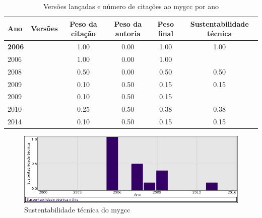 \begin{table}[H]
\caption{Versões lançadas e número de citações ao mygcc por ano}
\centering
\begin{tabular}{| l | c | c | c | c | c |}
  \hline
  Ano & Versões & Peso da citação & Peso da autoria & Peso final & Sustentabilidade técnica \\
  \hline
            {\bf 2006}
          &
          
          &
          1.00
          &
          0.00
          &
          1.00
          &
            {\color{blue} 1.00}
          \\
            2006
          &
          
          &
          1.00
          &
          0.00
          &
          1.00
          &
          \\
\hline
            2008
          &
          
          &
          0.50
          &
          0.00
          &
          0.50
          &
            {\color{blue} 0.50}
          \\
\hline
            2009
          &
          
          &
          0.10
          &
          0.50
          &
          0.15
          &
            {\color{red} 0.15}
          \\
            2009
          &
          
          &
          0.10
          &
          0.50
          &
          0.15
          &
          \\
\hline
            2010
          &
          
          &
          0.25
          &
          0.50
          &
          0.38
          &
            {\color{red} 0.38}
          \\
\hline
            2014
          &
          
          &
          0.10
          &
          0.50
          &
          0.15
          &
            {\color{red} 0.15}
          \\
\hline
\end{tabular}
\end{table}

\begin{figure}[h]
  \center
  \includegraphics[scale=0.50]{imagens/softwares-charts/mygcc.png}
  \caption{Sustentabilidade técnica do mygcc}
\end{figure}


